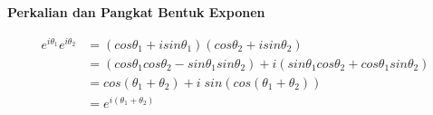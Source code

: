 \documentclass{article}
\begin{document}
\newpage
\begin{center}
    \textbf{Perkalian dan Pangkat Bentuk Exponen}
\end{center}
\begin{align}
    e^{i\theta_1} e^{i\theta_2} & = (cos\theta_1 + i sin\theta_1)(cos\theta_2 + i sin\theta_2)
    \nonumber                                                                                                                                \\
                                & =(cos\theta_1 cos\theta_2 - sin\theta_1 sin\theta_2) + i(sin\theta_1cos\theta_2 + cos\theta_1 sin\theta_2)
    \nonumber                                                                                                                                \\
                                & = cos(\theta_1 + \theta_2) + i\;sin(cos(\theta_1 + \theta_2))
    \nonumber                                                                                                                                \\
                                & = e^{i(\theta_1 + \theta_2)}
\end{align}
\end{document}
